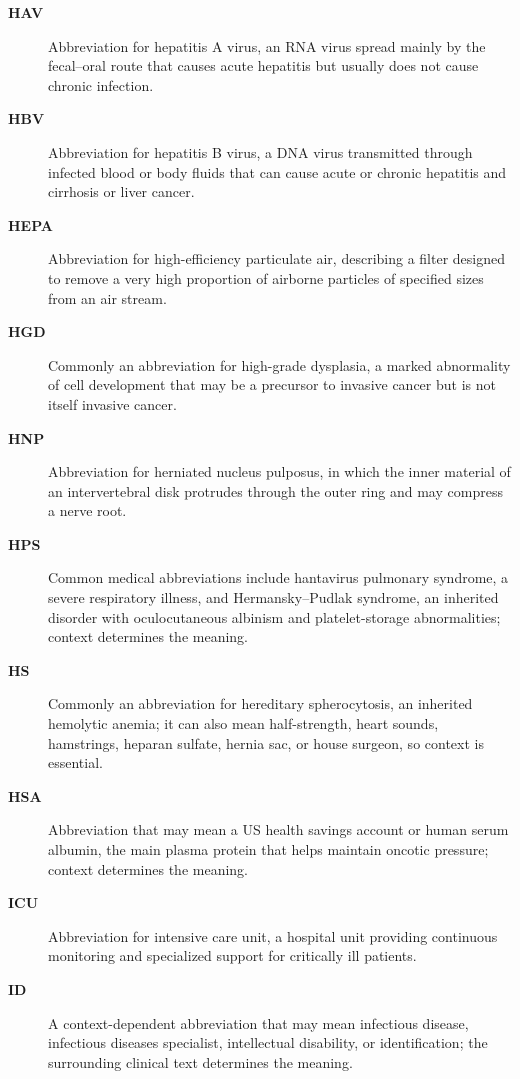 \begin{description}
\item[\textbf{HAV}] Abbreviation for hepatitis A virus, an RNA virus spread mainly by the fecal--oral route that causes acute hepatitis but usually does not cause chronic infection.

\item[\textbf{HBV}] Abbreviation for hepatitis B virus, a DNA virus transmitted through infected blood or body fluids that can cause acute or chronic hepatitis and cirrhosis or liver cancer.

\item[\textbf{HEPA}] Abbreviation for high-efficiency particulate air, describing a filter designed to remove a very high proportion of airborne particles of specified sizes from an air stream.

\item[\textbf{HGD}] Commonly an abbreviation for high-grade dysplasia, a marked abnormality of cell development that may be a precursor to invasive cancer but is not itself invasive cancer.

\item[\textbf{HNP}] Abbreviation for herniated nucleus pulposus, in which the inner material of an intervertebral disk protrudes through the outer ring and may compress a nerve root.

\item[\textbf{HPS}] Common medical abbreviations include hantavirus pulmonary syndrome, a severe respiratory illness, and Hermansky--Pudlak syndrome, an inherited disorder with oculocutaneous albinism and platelet-storage abnormalities; context determines the meaning.

\item[\textbf{HS}] Commonly an abbreviation for hereditary spherocytosis, an inherited hemolytic anemia; it can also mean half-strength, heart sounds, hamstrings, heparan sulfate, hernia sac, or house surgeon, so context is essential.

\item[\textbf{HSA}] Abbreviation that may mean a US health savings account or human serum albumin, the main plasma protein that helps maintain oncotic pressure; context determines the meaning.

\item[\textbf{ICU}] Abbreviation for intensive care unit, a hospital unit providing continuous monitoring and specialized support for critically ill patients.

\item[\textbf{ID}] A context-dependent abbreviation that may mean infectious disease, infectious diseases specialist, intellectual disability, or identification; the surrounding clinical text determines the meaning.


\end{description}
